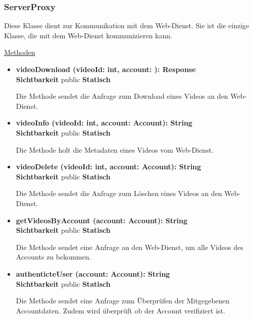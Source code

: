 \subsubsection{ServerProxy}\label{ServerProxy}

Diese Klasse dient zur Kommunikation mit dem Web-Dienst. Sie ist die einzige Klasse, die mit dem Web-Dienst kommunizieren kann. \newline

\underline{Methoden}
\begin{itemize}
\itemsep0pt

\item \textbf{videoDownload (videoId: int, account: ): Response}\hfill\\
\textbf{Sichtbarkeit} public \newline
\textbf{Statisch}

Die Methode sendet die Anfrage zum Download eines Videos an den Web-Dienst.

\item \textbf{videoInfo (videoId: int, account: Account): String}\hfill\\
\textbf{Sichtbarkeit} public \newline
\textbf{Statisch}

Die Methode holt die Metadaten eines Videos vom Web-Dienst.

\item \textbf{videoDelete (videoId: int, account: Account): String}\hfill\\
\textbf{Sichtbarkeit} public \newline
\textbf{Statisch}

Die Methode sendet die Anfrage zum Löschen eines Videos an den Web-Dienst.

\item \textbf{getVideosByAccount (account: Account): String}\hfill\\
\textbf{Sichtbarkeit} public \newline
\textbf{Statisch}

Die Methode sendet eine Anfrage an den Web-Dienst, um alle Videos des Accounts zu bekommen.

\item \textbf{authenticteUser (account: Account): String}\hfill\\
\textbf{Sichtbarkeit} public \newline
\textbf{Statisch}

Die Methode sendet eine Anfrage zum Überprüfen der Mitgegebenen Accountdaten. Zudem wird überprüft ob der Account verifiziert ist.


\end{itemize}
